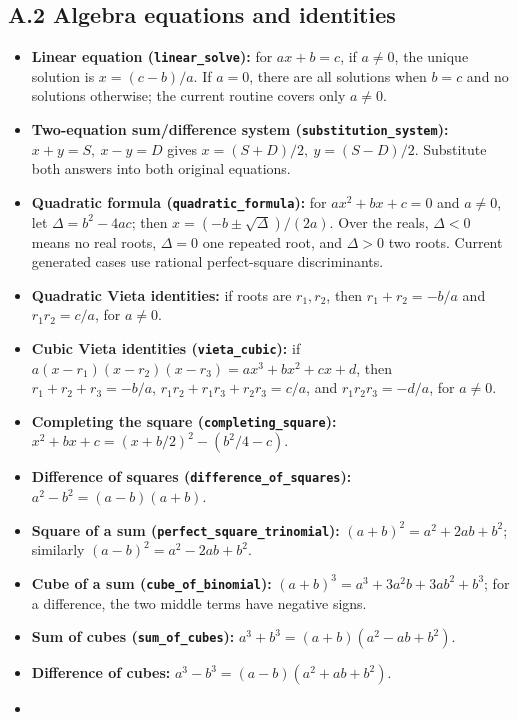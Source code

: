 \documentclass[
  10pt,
]{article}
\providecommand{\tightlist}{%
  \setlength{\itemsep}{0pt}\setlength{\parskip}{0pt}}
\begin{document}
\subsection{A.2 Algebra equations and
identities}\label{a.2-algebra-equations-and-identities}

\begin{itemize}
\tightlist
\item
  \textbf{Linear equation (\texttt{linear\_solve}):} for \(ax+b=c\), if
  \(a\ne0\), the unique solution is \(x=(c-b)/a\). If \(a=0\), there are
  all solutions when \(b=c\) and no solutions otherwise; the current
  routine covers only \(a\ne0\).
\item
  \textbf{Two-equation sum/difference system
  (\texttt{substitution\_system}):} \(x+y=S,\ x-y=D\) gives
  \(x=(S+D)/2,\ y=(S-D)/2\). Substitute both answers into both original
  equations.
\item
  \textbf{Quadratic formula (\texttt{quadratic\_formula}):} for
  \(ax^2+bx+c=0\) and \(a\ne0\), let \(\Delta=b^2-4ac\); then
  \(x=(-b\pm\sqrt\Delta)/(2a)\). Over the reals, \(\Delta<0\) means no
  real roots, \(\Delta=0\) one repeated root, and \(\Delta>0\) two
  roots. Current generated cases use rational perfect-square
  discriminants.
\item
  \textbf{Quadratic Vieta identities:} if roots are \(r_1,r_2\), then
  \(r_1+r_2=-b/a\) and \(r_1r_2=c/a\), for \(a\ne0\).
\item
  \textbf{Cubic Vieta identities (\texttt{vieta\_cubic}):} if
  \(a(x-r_1)(x-r_2)(x-r_3)=ax^3+bx^2+cx+d\), then \(r_1+r_2+r_3=-b/a\),
  \(r_1r_2+r_1r_3+r_2r_3=c/a\), and \(r_1r_2r_3=-d/a\), for \(a\ne0\).
\item
  \textbf{Completing the square (\texttt{completing\_square}):}
  \(x^2+bx+c=(x+b/2)^2-(b^2/4-c)\).
\item
  \textbf{Difference of squares (\texttt{difference\_of\_squares}):}
  \(a^2-b^2=(a-b)(a+b)\).
\item
  \textbf{Square of a sum (\texttt{perfect\_square\_trinomial}):}
  \((a+b)^2=a^2+2ab+b^2\); similarly \((a-b)^2=a^2-2ab+b^2\).
\item
  \textbf{Cube of a sum (\texttt{cube\_of\_binomial}):}
  \((a+b)^3=a^3+3a^2b+3ab^2+b^3\); for a difference, the two middle
  terms have negative signs.
\item
  \textbf{Sum of cubes (\texttt{sum\_of\_cubes}):}
  \(a^3+b^3=(a+b)(a^2-ab+b^2)\).
\item
  \textbf{Difference of cubes:} \(a^3-b^3=(a-b)(a^2+ab+b^2)\).
\item

\end{itemize}
\end{document}
